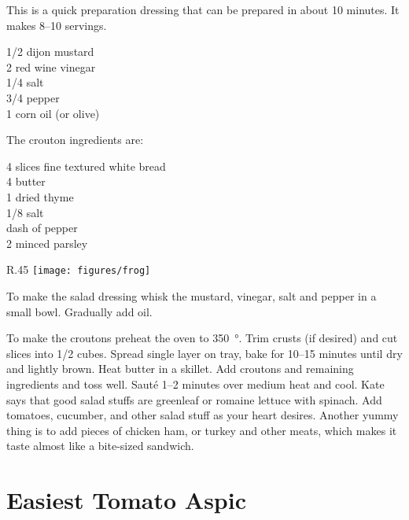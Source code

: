 \begin{open}
  This is a quick preparation dressing that can be prepared in about 10
  minutes.  It makes \numrange{8}{10} servings.
\end{open}
\begin{ingredients}
  \SI{1/2}{\cup} dijon mustard \\
  \SI{2}{\tblspoon} red wine vinegar \\
  \SI{1/4}{\teaspoon} salt \\
  \SI{3/4}{\teaspoon} pepper \\
  \SI{1}{\cup} corn oil (or olive)
\end{ingredients}
The crouton ingredients are:
\begin{ingredients}
  4 slices fine textured white bread \\
  \SI{4}{\tblspoon}  butter \\
  \SI{1}{\teaspoon} dried thyme \\
  \SI{1/8}{\teaspoon} salt \\
  dash of pepper \\
  \SI{2}{\teaspoon} minced parsley
\end{ingredients}
\begin{wrapfigure}{R}{.45\textwidth}
\centering\texttt{[image: figures/frog]}
\end{wrapfigure}
To make the salad dressing whisk the mustard, vinegar, salt and pepper in a
small bowl.  Gradually add oil.

To make the croutons preheat the oven to \SI{350}{\degree}.  Trim crusts (if
desired) and cut slices into \SI{1/2}{\inch} cubes.  Spread single layer on
tray, bake for \numrange{10}{15} minutes until dry and lightly brown.  Heat
butter in a skillet.  Add croutons and remaining ingredients and toss well.
Saut\'{e} \numrange{1}{2} minutes over medium heat and cool.  Kate says that
good salad stuffs are greenleaf or romaine lettuce with spinach.  Add
tomatoes, cucumber, and other salad stuff as your heart desires.  Another
yummy thing is to add pieces of chicken ham, or turkey
and other meats, which makes it taste almost like a bite-sized sandwich.

\section{Easiest Tomato Aspic}

